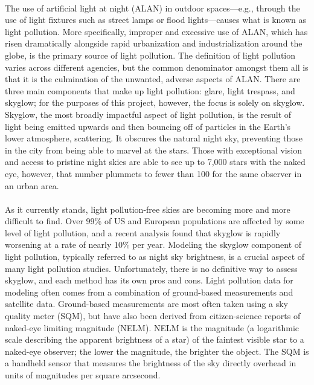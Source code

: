 \documentclass[11 pt]{article}  %
\begin{document}
\paragraph{}The use of artificial light at night (ALAN) in outdoor spaces—e.g., through the 
use of light fixtures such as street lamps or flood lights—causes what is known 
as light pollution. More specifically, improper and excessive use of ALAN, which 
has risen dramatically alongside rapid urbanization and industrialization around 
the globe, is the primary source of light pollution. The definition of light pollution 
varies across different agencies, but the common denominator amongst them all is 
that it is the culmination of the unwanted, adverse aspects of ALAN. There are 
three main components that make up light pollution: glare, light trespass, and 
skyglow; for the purposes of this project, however, the focus is solely on 
skyglow\cite{Welch}. Skyglow, the most broadly impactful aspect of light pollution, 
is the result of light being emitted upwards and then bouncing off of particles 
in the Earth's lower atmosphere, scattering. It obscures the natural night sky, 
preventing those in the city from being able to marvel at the stars. Those with 
exceptional vision and access to pristine night skies are able to see up to 7,000 
stars with the naked eye, however, that number plummets to fewer than 100 for the 
same observer in an urban area\cite{Mizon}.

\paragraph{}As it currently stands, light pollution-free skies are becoming more and more 
difficult to find. Over 99\% of US and European populations are affected by some 
level of light pollution, and a recent analysis found that skyglow is rapidly 
worsening at a rate of nearly 10\% per year\cite{Kyba}. Modeling the skyglow 
component of light pollution, typically referred to as night sky brightness, is 
a crucial aspect of many light pollution studies. Unfortunately, there is no 
definitive way to assess skyglow, and each method has its own pros and cons. 
Light pollution data for modeling often comes from a combination of ground-based 
measurements and satellite data. Ground-based measurements are most often taken 
using a sky quality meter (SQM), but have also been derived from citizen-science 
reports of naked-eye limiting magnitude (NELM). NELM is the magnitude (a 
logarithmic scale describing the apparent brightness of a star) of the faintest 
visible star to a naked-eye observer; the lower the magnitude, the brighter the 
object. The SQM is a handheld sensor that measures the brightness of the sky 
directly overhead in units of magnitudes per square arcsecond.
\end{document}

